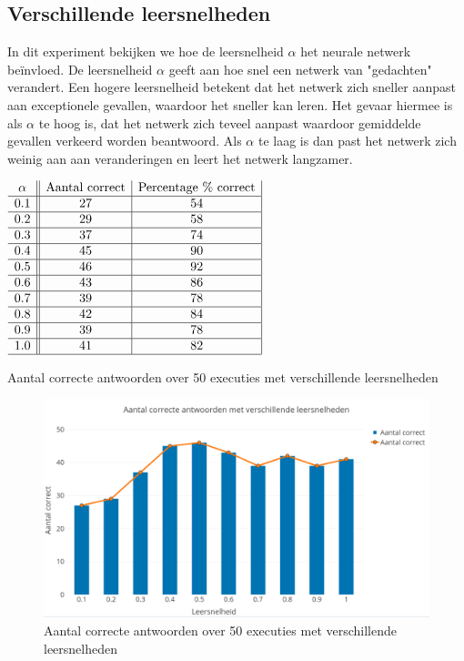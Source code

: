 \subsection{Verschillende leersnelheden}
In dit experiment bekijken we hoe de leersnelheid $\alpha$ het neurale netwerk be\"invloed. De leersnelheid $\alpha$ geeft aan hoe snel een netwerk van "gedachten" verandert. Een hogere leersnelheid betekent dat het netwerk zich sneller aanpast aan exceptionele gevallen, waardoor het sneller kan leren. Het gevaar hiermee is als $\alpha$ te hoog is, dat het netwerk zich teveel aanpast waardoor gemiddelde gevallen verkeerd worden beantwoord. Als $\alpha$ te laag is dan past het netwerk zich weinig aan aan veranderingen en leert het netwerk langzamer.

\begin{table}[ht]
    \centering
      $\begin{array}{c||c|c |}
        \alpha & \text{Aantal correct} & \text{Percentage \% correct} \\ \hline
        0.1 & 27 & 54 \\ \hline
        0.2 & 29 & 58 \\ \hline
        0.3 & 37 & 74 \\ \hline
        0.4 & 45 & 90 \\ \hline
        0.5 & 46 & 92 \\ \hline
        0.6 & 43 & 86 \\ \hline
        0.7 & 39 & 78 \\ \hline
        0.8 & 42 & 84 \\ \hline
        0.9 & 39 & 78 \\ \hline
        1.0 & 41 & 82 \\ \hline
      \end{array}$
    \caption{Aantal correcte antwoorden over 50 executies met verschillende leersnelheden}
    \label{tab:leersnelheden}
\end{table}

\begin{figure}[ht]
    \centering
    \includegraphics[scale=0.3]{graphs/leersnelheden.png}
    \caption{Aantal correcte antwoorden over 50 executies met verschillende leersnelheden}
    \label{fig:leersneheden}
\end{figure}

